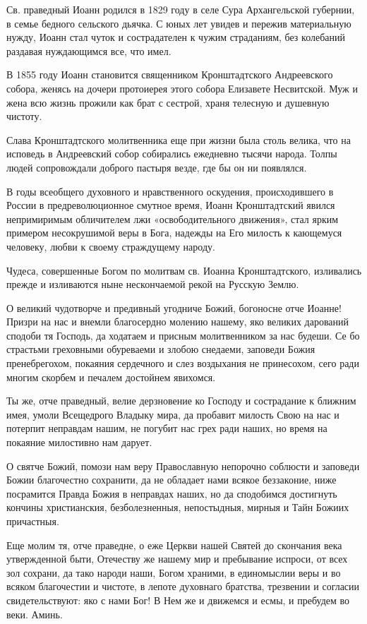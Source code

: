 \begin{mymulticols}


Св. праведный Иоанн родился в 1829 году в селе Сура Архангельской губернии, в семье бедного сельского дьячка. С юных лет увидев и пережив материальную нужду, Иоанн стал чуток и сострадателен к чужим страданиям, без колебаний раздавая нуждающимся все, что имел.


В 1855 году Иоанн становится священником Кронштадтского Андреевского собора, женясь на дочери протоиерея этого собора Елизавете Несвитской. Муж и жена всю жизнь прожили как брат с сестрой, храня телесную и душевную чистоту.


Слава Кронштадтского молитвенника еще при жизни была столь велика, что на исповедь в Андреевский собор собирались ежедневно тысячи народа. Толпы людей сопровождали доброго пастыря везде, где бы он ни появлялся.


В годы всеобщего духовного и нравственного оскудения, происходившего в России в предреволюционное смутное время, Иоанн Кронштадтский явился непримиримым обличителем лжи «освободительного движения», стал ярким примером несокрушимой веры в Бога, надежды на Его милость к кающемуся человеку, любви к своему страждущему народу.


Чудеса, совершенные Богом по молитвам св. Иоанна Кронштадтского, изливались прежде и изливаются ныне нескончаемой рекой на Русскую Землю.




О великий чудотворче и предивный угодниче Божий, богоносне отче Иоанне! Призри на нас и внемли благосердно молению нашему, яко великих дарований сподоби тя Господь, да ходатаем и присным молитвенником за нас будеши. Се бо страстьми греховными обуреваеми и злобою снедаеми, заповеди Божия пренебрегохом, покаяния сердечного и слез воздыхания не принесохом, сего ради многим скорбем и печалем достойнем явихомся.


Ты же, отче праведный, велие дерзновение ко Господу и сострадание к ближним имея, умоли Всещедрого Владыку мира, да пробавит милость Свою на нас и потерпит неправдам нашим, не погубит нас грех ради наших, но время на покаяние милостивно нам дарует.


О святче Божий, помози нам веру Православную непорочно соблюсти и заповеди Божии благочестно сохранити, да не обладает нами всякое беззаконие, ниже посрамится Правда Божия в неправдах наших, но да сподобимся достигнуть кончины христианския, безболезненныя, непостыдныя, мирныя и Тайн Божиих причастныя.


Еще молим тя, отче праведне, о еже Церкви нашей Святей до скончания века утвержденной быти, Отечеству же нашему мир и пребывание испроси, от всех зол сохрани, да тако народи наши, Богом храними, в единомыслии веры и во всяком благочестии и чистоте, в лепоте духовнаго братства, трезвении и согласии свидетельствуют: яко с нами Бог! В Нем же и движемся и есмы, и пребудем во веки. Аминь.


\end{mymulticols}

